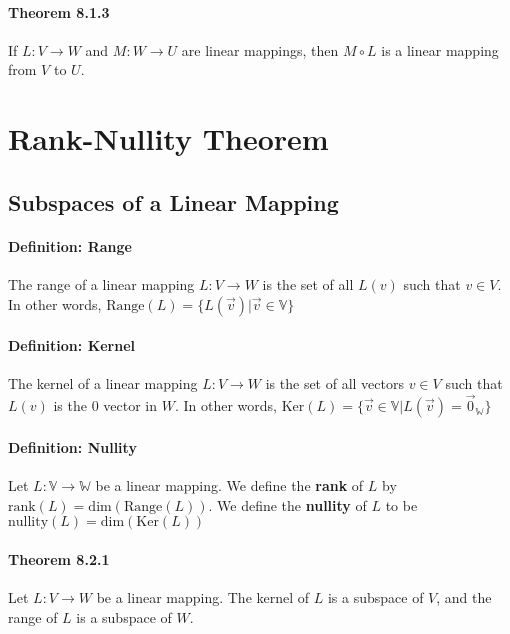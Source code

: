 \documentclass[10pt,letter]{article}
\begin{document}
\paragraph{Theorem 8.1.3} If $L:V\rightarrow W$ and $M:W\rightarrow U$ are linear mappings, then $M\circ L$ is a linear mapping from $V$ to $U$.

\section*{Rank-Nullity Theorem}
\subsection*{Subspaces of a Linear Mapping} 
\paragraph{Definition: Range} The range of a linear mapping $L:V\rightarrow W$ is the set of all $L(v)$ such that $v\in V$. In other words, $\text{Range}(L)=\{L(\vec{v})|\vec{v}\in\mathbb{V}\}$ 
\paragraph{Definition: Kernel} The kernel of a linear mapping $L:V\rightarrow W$ is the set of all vectors $v\in V$ such that $L(v)$ is the $0$ vector in $W$. In other words, $\text{Ker}(L)=\{\vec{v}\in\mathbb{V}|L(\vec{v})=\vec{0}_{\mathbb{W}}\}$

\paragraph{Definition: Nullity} Let $L:\mathbb{V}\rightarrow\mathbb{W}$ be a linear mapping. We define the \textbf{rank} of $L$ by $\text{rank}(L)=\text{dim}(\text{Range}(L))$. We define the \textbf{nullity} of $L$ to be $\text{nullity}(L)=\text{dim}(\text{Ker}(L))$

\paragraph{Theorem 8.2.1} Let $L:V\rightarrow W$ be a linear mapping. The kernel of $L$ is a subspace of $V$, and the range of $L$ is a subspace of $W$. 
\end{document}
